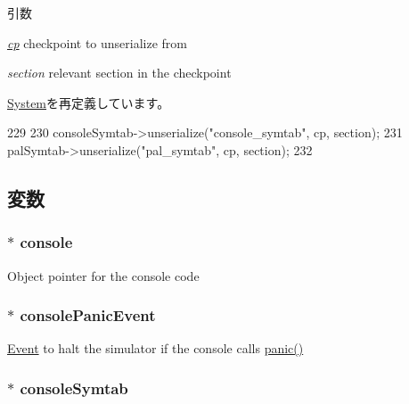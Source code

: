 \begin{DoxyParams}{引数}
\item[{\em \hyperlink{namespacecp}{cp}}]checkpoint to unserialize from \item[{\em section}]relevant section in the checkpoint \end{DoxyParams}


\hyperlink{classSystem_a3536a2e47acf307ec65515712f0e2b2d}{System}を再定義しています。


\begin{DoxyCode}
229 {
230     consoleSymtab->unserialize("console_symtab", cp, section);
231     palSymtab->unserialize("pal_symtab", cp, section);
232 }
\end{DoxyCode}


\subsection{変数}
\hypertarget{classAlphaSystem_ac1fd76adeba49aea2ab70e0cba58d9d0}{
\subsubsection[{console}]{$\ast$ {\bf console}}}
\label{classAlphaSystem_ac1fd76adeba49aea2ab70e0cba58d9d0}
Object pointer for the console code \hypertarget{classAlphaSystem_a0266101e4c5bb3cef386e47221ba7f83}{
\subsubsection[{consolePanicEvent}]{$\ast$ {\bf consolePanicEvent}}}
\label{classAlphaSystem_a0266101e4c5bb3cef386e47221ba7f83}
\hyperlink{classEvent}{Event} to halt the simulator if the console calls \hyperlink{base_2misc_8hh_a1445e207e36c97ff84c54b47288cea19}{panic()} \hypertarget{classAlphaSystem_a112883d2eb9b5a5c79f3717e73a15dbb}{
\subsubsection[{consoleSymtab}]{$\ast$ {\bf consoleSymtab}}}
